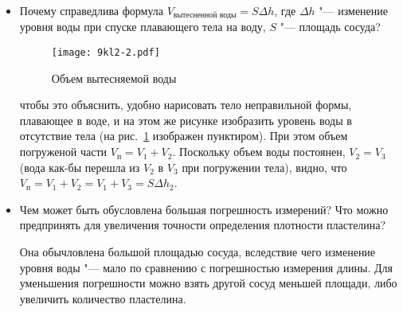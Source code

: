 \begin{itemize}
  \item Почему справедлива формула \(V_\text{вытесненной воды} = S\Delta h\), где \(\Delta h\) "--- изменение уровня воды при спуске плавающего тела на воду, \(S\) "--- площадь сосуда?\par
  \begin{figure}[h!]
    \centering
    \texttt{[image: 9kl2-2.pdf]}
    \caption{Объем вытесняемой воды}
    \label{fig:9kl2:vol}
 \end{figure}
  \Answer чтобы это объяснить, удобно нарисовать тело неправильной формы, плавающее в воде, и на этом же рисунке изобразить уровень воды в отсутствие тела (на рис.~\ref{fig:9kl2:vol} изображен пунктиром). \label{ans:9kl2:vol}
 При этом объем погруженой части \(V_\text{п} = V_1 + V_2\). Поскольку объем воды постоянен, \(V_2 = V_3\) (вода как-бы перешла из \(V_2\) в \(V_3\) при погружении тела), видно, что \(V_\text{п} = V_1 + V_2=V_1+V_3=S\Delta h_2\).
  \item Чем может быть обусловлена большая погрешность измерений? Что можно предпринять для увеличения точности определения плотности пластелина?\par
  \Answer Она обычловлена большой площадью сосуда, вследствие чего изменение уровня воды "--- мало по сравнению с погрешностью измерения длины. Для уменьшения погрешности можно взять другой сосуд меньшей площади, либо увеличить количество пластелина.
\end{itemize}
